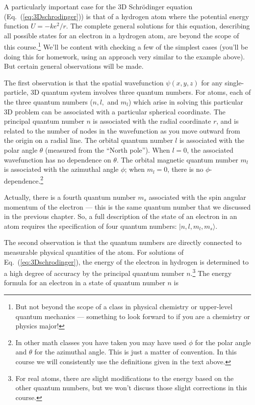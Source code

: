 A particularly important case for the 3D Schr\"{o}dinger equation
(Eq.~(\ref{eq:3Dschrodinger})) is that of a hydrogen atom where the
potential energy function $U = -ke^2/r$.  The complete general
solutions for this equation, describing all possible states for an
electron in a hydrogen atom, are beyond the scope of this
course.\footnote{But not beyond the scope of a class in physical
  chemistry or upper-level quantum mechanics --- something to look
  forward to if you are a chemistry or physics major!}  We'll be
content with checking a few of the simplest cases (you'll be doing
this for homework, using an approach very similar to the example
above).  But certain general observations will be made.

The first observation is that the spatial wavefunction $\psi(x,y,z)$
for any single-particle, 3D quantum system involves three quantum
numbers.  For atoms, each of the three quantum numbers ($n, l,$ and
$m_l$) which arise in solving this particular 3D problem can be
associated with a particular spherical coordinate.  The principal
quantum number $n$ is associated with the radial coordinate $r$, and
is related to the number of nodes in the wavefunction as you move
outward from the origin on a radial line.  The orbital quantum number
$l$ is associated with the polar angle $\theta$ (measured from the
``North pole'').  When $l=0$, the associated wavefunction has no
dependence on $\theta$.  The orbital magnetic quantum number $m_l$ is
associated with the azimuthal angle $\phi$; when $m_l = 0$, there is
no $\phi$-dependence.\footnote{In other math classes you have taken
  you may have used $\phi$ for the polar angle and $\theta$ for the
  azimuthal angle.  This is just a matter of convention. In this
  course we will consistently use the definitions given in the text
  above.}

Actually, there is a fourth quantum number $m_s$ associated with the
spin angular momentum of the electron --- this is the same quantum
number that we discussed in the previous chapter.  So, a full
description of the state of an electron in an atom requires the
specification of four quantum numbers: $|n,l,m_l,m_s\rangle$.

The second observation is that the quantum numbers are directly
connected to measurable physical quantities of the atom.  For
solutions of Eq.~(\ref{eq:3Dschrodinger}), the energy of the electron
in hydrogen is determined to a high degree of accuracy by the
principal quantum number $n$.\footnote{For real atoms, there are
  slight modifications to the energy based on the other quantum
  numbers, but we won't discuss those slight corrections in this
  course.}  The energy formula for an electron in a state of quantum
number $n$ is


